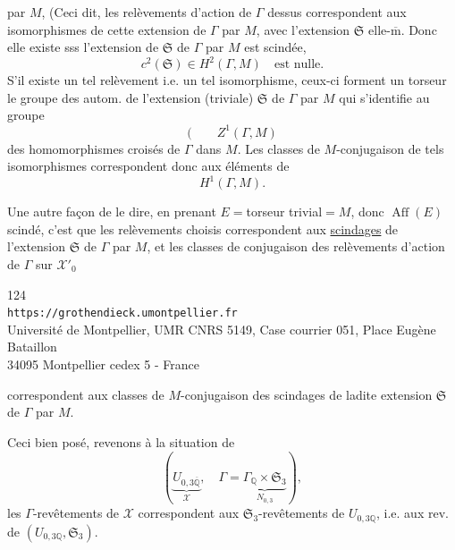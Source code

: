 par $M$,  (Ceci dit, les relèvements d'action de $\Gamma$ dessus correspondent aux isomorphismes de cette extension de $\Gamma$ par $M$, avec l'extension $\mathfrak S$ elle-$\overline{\mathrm m}$. Donc elle existe sss l'extension de $\mathfrak S$ de $\Gamma$ par $M$ est scindée,  
\[
c^2(\mathfrak S)\in H^2(\Gamma,M)\quad\text{est nulle.}
\tag{282}
\]
S'il existe un tel relèvement i.e. un tel isomorphisme, ceux-ci forment un torseur  le groupe des autom. de l'extension (triviale) $\mathfrak S$ de $\Gamma$ par $M$ qui s'identifie au groupe
\[
(\qquad Z^1(\Gamma,M)
\]
des homomorphismes croisés de $\Gamma$ dans $M$. Les classes de $M$-conjugaison de tels  isomorphismes correspondent donc aux éléments de
\[
H^1(\Gamma,M).
\]

Une autre façon de le dire, en prenant $E={}$torseur trivial${}=M$, donc $\operatorname{Aff}(E)$ scindé, c'est que les relèvements choisis correspondent aux \uline{scindages} de l'extension $\mathfrak S$ de $\Gamma$ par $M$, et les classes de conjugaison des relèvements d'action de $\Gamma$ sur $\mathcal X'_0$


\begin{center}
\small
124\\
\texttt{https://grothendieck.umontpellier.fr}\\
Université de Montpellier, UMR CNRS 5149, Case courrier 051, Place Eugène Bataillon\\
34095 Montpellier cedex 5 - France
\end{center}


correspondent aux classes de $M$-conjugaison des scindages de ladite extension $\mathfrak S$ de $\Gamma$ par $M$.

Ceci bien posé, revenons à la situation de
\[
\left(\underbrace{U_{0,3\overline{\mathbb Q}}}_{\mathcal X},\quad
\Gamma=\underbrace{\Gamma_{\mathbb Q}\times\mathfrak S_3}_{N_{0,3}}\right),
\]
les $\Gamma$-revêtements de $\mathcal X$ correspondent aux $\mathfrak S_3$-revêtements de $U_{0,3\mathbb Q}$, i.e. aux rev. de $(U_{0,3\mathbb Q},\mathfrak S_3)$.



